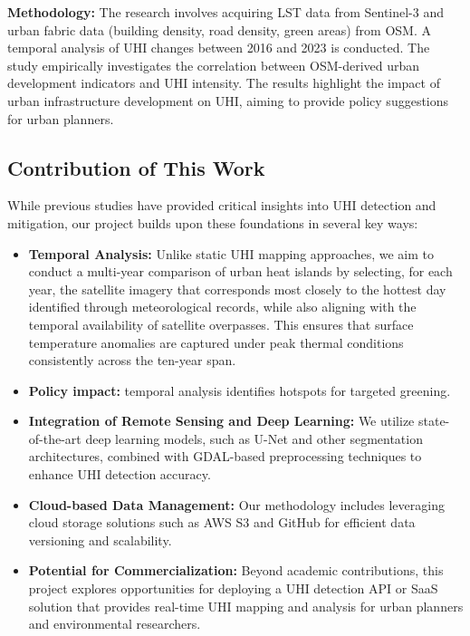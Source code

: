 \documentclass{article}
\begin{document}
\begin{itemize}
    \textbf{Methodology:} The research involves acquiring LST data from Sentinel-3 and urban fabric data (building density, road density, green areas) from OSM. A temporal analysis of UHI changes between 2016 and 2023 is conducted. The study empirically investigates the correlation between OSM-derived urban development indicators and UHI intensity. The results highlight the impact of urban infrastructure development on UHI, aiming to provide policy suggestions for urban planners.

\end{itemize}


\subsection{Contribution of This Work}

While previous studies have provided critical insights into UHI detection and mitigation, our project builds upon these foundations in several key ways:

\begin{itemize}
    \item \textbf{Temporal Analysis:} Unlike static UHI mapping approaches, we aim to conduct a multi-year comparison of urban heat islands by selecting, for each year, the satellite imagery that corresponds most closely to the hottest day identified through meteorological records, while also aligning with the temporal availability of satellite overpasses. This ensures that surface temperature anomalies are captured under peak thermal conditions consistently across the ten-year span.
    \item \textbf{Policy impact:} temporal analysis identifies hotspots for targeted greening.
    \item \textbf{Integration of Remote Sensing and Deep Learning:} We utilize state-of-the-art deep learning models, such as U-Net and other segmentation architectures, combined with GDAL-based preprocessing techniques to enhance UHI detection accuracy. 
    \item \textbf{Cloud-based Data Management:} Our methodology includes leveraging cloud storage solutions such as AWS S3 and GitHub for efficient data versioning and scalability.
    \item \textbf{Potential for Commercialization:} Beyond academic contributions, this project explores opportunities for deploying a UHI detection API or SaaS solution that provides real-time UHI mapping and analysis for urban planners and environmental researchers.
\end{itemize}
\end{document}
